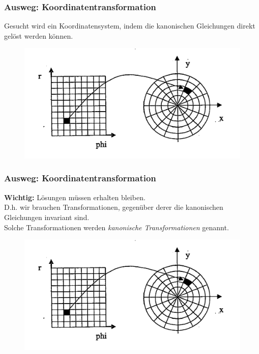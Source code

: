 \begin{frame}
    \frametitle{Ausweg: Koordinatentransformation}
    
    Gesucht wird ein Koordinatensystem, indem die kanonischen Gleichungen direkt gelöst werden können.
    
    \begin{figure}
        \includegraphics[scale=0.2]{images/koordtrans.png}
    \end{figure}
    
    
\end{frame}

\begin{frame}
    \frametitle{Ausweg: Koordinatentransformation}
    
    \textbf{Wichtig:} Lösungen müssen erhalten bleiben.\\
    D.h. wir brauchen Transformationen, gegenüber derer die kanonischen Gleichungen invariant sind. \\
    \vspace{5mm}    
    Solche Transformationen werden \emph{kanonische Transformationen} genannt.
    
    \begin{figure}
        \includegraphics[scale=0.2]{images/koordtrans.png}
    \end{figure}
    
    
\end{frame}